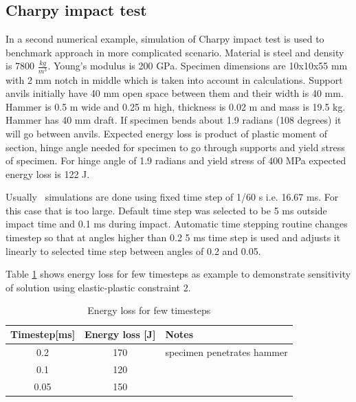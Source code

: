 \subsection{Charpy impact test}
In a second numerical example, simulation of Charpy impact test is
used to benchmark approach in more complicated scenario. 
Material is steel and density is 7800 $\frac{kg}{m^{3}}$. Young’s modulus is 200 GPa.
Specimen dimensions are 10x10x55 mm with 2 mm notch in middle which is taken into account in calculations.
Support anvils initially have 40 mm open space between them and their width is 40 mm. 
Hammer is 0.5 m wide and 0.25 m high, thickness is 0.02 m and mass is 19.5 kg.
Hammer has 40 mm draft.
If specimen bends about 1.9 radians (108 degrees) it will go between anvils.
Expected energy loss is product of plastic moment of section, hinge angle needed for specimen to go through supports and 
yield stress of specimen. For hinge angle of 1.9 radians and yield stress of 400 MPa expected energy 
loss is 122 J.

Usually \bullet\ simulations are done using fixed time step of 1/60 s i.e. 16.67 ms. 
For this case that is too large. 
Default time step was selected to be 5 ms outside impact time and 0.1 ms during impact. 
Automatic time stepping routine changes timestep so that at angles higher than 0.2 5 ms time step is
used and adjusts it linearly to selected time step between angles of 0.2 and 0.05.

Table \ref{tab:ep2ts} shows energy loss for few timesteps as example to demonstrate sensitivity of solution
using  elastic-plastic constraint 2.

\begin {table}[htb!]
\caption {Energy loss for few timesteps}
\label{tab:ep2ts} 
\begin{center}
\begin{tabular}{| c| c|l|}
\hline
{\bf Timestep[ms]} & {\bf Energy loss [J]} & {\bf Notes} \\ \hline
 0.2 &  170 & specimen penetrates hammer  \\ \hline
 0.1 &  120 & \\ \hline
 0.05 &  150 & \\ \hline
\end {tabular}
\end{center}
\end {table}

